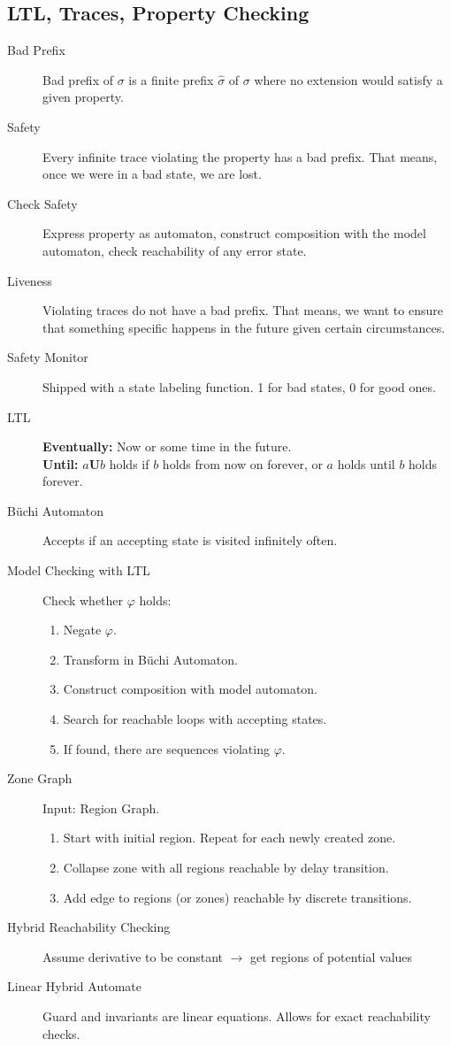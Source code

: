 \subsection{LTL, Traces, Property Checking}

\begin{description}
	\item[Bad Prefix] Bad prefix of $\sigma$ is a finite prefix $\hat\sigma$ of
	$\sigma$ where no extension would satisfy a given property.
	\item[Safety] Every infinite trace violating the property has a bad prefix.
	That means, once we were in a bad state, we are lost.
	\item[Check Safety] Express property as automaton, construct composition with
	the model automaton, check reachability of any error state.
	\item[Liveness] Violating traces do not have a bad prefix. That means, we want
	to ensure that something specific happens in the future given certain
	circumstances.
	\item[Safety Monitor] Shipped with a state labeling function. 1 for bad states,
	0 for good ones.
	\item[LTL] \textbf{Eventually:} Now or some time in the future.\\
	\textbf{Until:} $a\textbf{U}b$ holds if $b$ holds from now on forever, or $a$
	holds until $b$ holds forever.
	\item[Büchi Automaton] Accepts if an accepting state is visited infinitely
	often.
	\item[Model Checking with LTL] Check whether $\varphi$ holds: 
	\begin{enumerate}
		\item Negate $\varphi$.
		\item Transform in Büchi Automaton.
		\item Construct composition with model automaton.
		\item Search for reachable loops with accepting states.
		\item If found, there are sequences violating $\varphi$.
	\end{enumerate}
	\item[Zone Graph] Input: Region Graph.
	\begin{enumerate}
		\item Start with initial region. Repeat for each newly created zone.
		\item Collapse zone with all regions reachable by delay transition. 
		\item Add edge to regions (or zones) reachable by discrete transitions.
	\end{enumerate}
	\item[Hybrid Reachability Checking] Assume derivative to be constant
	$\rightarrow$ get regions of potential values
	\item[Linear Hybrid Automate] Guard and invariants are linear equations. Allows
	for exact reachability checks.
\end{description}
